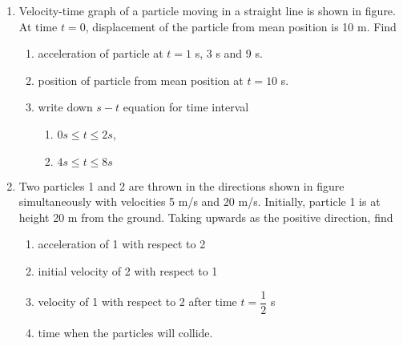 \documentclass{article}
\renewcommand{\frac}[2]{\dfrac{#1}{#2}}
\begin{document}
\begin{enumerate}
    \begin{center}
    \end{center}
    
    \item Velocity-time graph of a particle moving in a straight line is shown in figure. At time \( t = 0 \), displacement of the particle from mean position is 10 m. Find

    \begin{center}
    \end{center}
    
    \begin{enumerate}
        \item acceleration of particle at \( t = 1 \) s, 3 s and 9 s.
        \item position of particle from mean position at \( t = 10 \) s.
        \item write down \( s-t \) equation for time interval
        \begin{enumerate}
            \item \( 0 s \leq t \leq 2 s \),
            \item \( 4 s \leq t \leq 8 s \)
        \end{enumerate}
    \end{enumerate}
    
    \item Two particles 1 and 2 are thrown in the directions shown in figure simultaneously with velocities 5 m/s and 20 m/s. Initially, particle 1 is at height 20 m from the ground. Taking upwards as the positive direction, find

    \begin{center}
    \end{center}
    
    \begin{enumerate}
        \item acceleration of 1 with respect to 2
        \item initial velocity of 2 with respect to 1
        \item velocity of 1 with respect to 2 after time \( t = \frac{1}{2} \) s
        \item time when the particles will collide.
    \end{enumerate}
    

\end{enumerate}
\end{document}
